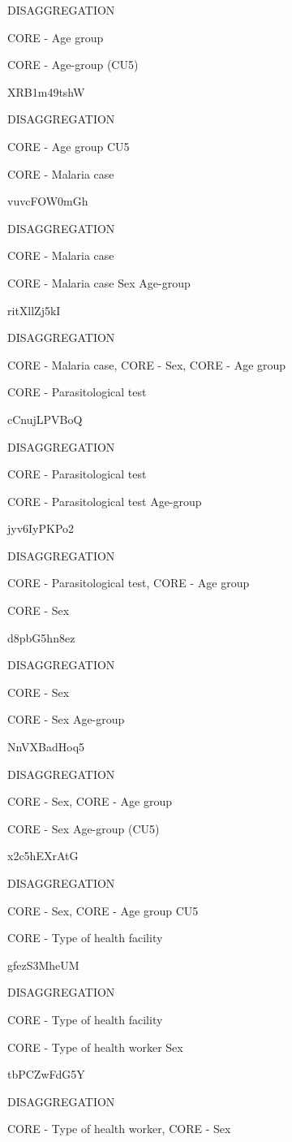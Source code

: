 \documentclass[]{book}
\begin{document}
DISAGGREGATION

CORE - Age group

CORE - Age-group (CU5)

XRB1m49tshW

DISAGGREGATION

CORE - Age group CU5

CORE - Malaria case

vuvcFOW0mGh

DISAGGREGATION

CORE - Malaria case

CORE - Malaria case \textbar{} Sex \textbar{} Age-group

ritXllZj5kI

DISAGGREGATION

CORE - Malaria case, CORE - Sex, CORE - Age group

CORE - Parasitological test

cCnujLPVBoQ

DISAGGREGATION

CORE - Parasitological test

CORE - Parasitological test \textbar{} Age-group

jyv6IyPKPo2

DISAGGREGATION

CORE - Parasitological test, CORE - Age group

CORE - Sex

d8pbG5hn8ez

DISAGGREGATION

CORE - Sex

CORE - Sex \textbar{} Age-group

NnVXBadHoq5

DISAGGREGATION

CORE - Sex, CORE - Age group

CORE - Sex \textbar{} Age-group (CU5)

x2c5hEXrAtG

DISAGGREGATION

CORE - Sex, CORE - Age group CU5

CORE - Type of health facility

gfezS3MheUM

DISAGGREGATION

CORE - Type of health facility

CORE - Type of health worker \textbar{} Sex

tbPCZwFdG5Y

DISAGGREGATION

CORE - Type of health worker, CORE - Sex
\end{document}
